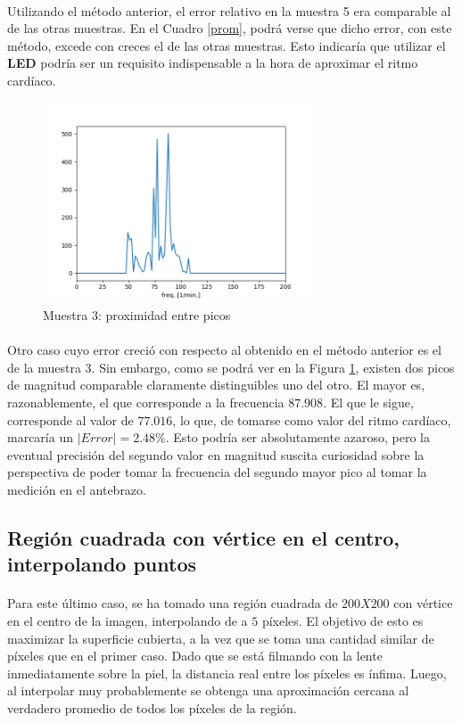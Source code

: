 \documentclass[12pt, twocolumn]{article}
\begin{document}
	\paragraph{} Utilizando el método anterior, el error relativo en la muestra 5 era comparable al de las otras muestras. En el Cuadro \ref{prom}, podrá verse que dicho error, con este método, excede con creces el de las otras muestras. Esto indicaría que utilizar el \textbf{LED} podría ser un requisito indispensable a la hora de aproximar el ritmo cardíaco.
	
	\begin{figure}[H]
		\centering
		\includegraphics[width=8cm]{sample3_all.png}
		\caption{Muestra 3: proximidad entre picos}
		\label{3prox}
	\end{figure}
	
	\paragraph{} Otro caso cuyo error creció con respecto al obtenido en el método anterior es el de la muestra 3. Sin embargo, como se podrá ver en la Figura \ref{3prox}, existen dos picos de magnitud comparable claramente distinguibles uno del otro. El mayor es, razonablemente, el que corresponde a la frecuencia $87.908$. El que le sigue, corresponde al valor de $77.016$, lo que, de tomarse como valor del ritmo cardíaco, marcaría un $|Error| = 2.48\%$. Esto podría ser absolutamente azaroso, pero la eventual precisión del segundo valor en magnitud suscita curiosidad sobre la perspectiva de poder tomar la frecuencia del segundo mayor pico al tomar la medición en el antebrazo.
	
	\subsection{Región cuadrada con vértice en el centro, interpolando puntos}
	
	\paragraph{} Para este último caso, se ha tomado una región cuadrada de $200X200$ con vértice en el centro de la imagen, interpolando de a $5$ píxeles. El objetivo de esto es maximizar la superficie cubierta, a la vez que se toma una cantidad similar de píxeles que en el primer caso. Dado que se está filmando con la lente inmediatamente sobre la piel, la distancia real entre los píxeles es ínfima. Luego, al interpolar muy probablemente se obtenga una aproximación cercana al verdadero promedio de todos los píxeles de la región.
	
\end{document}
